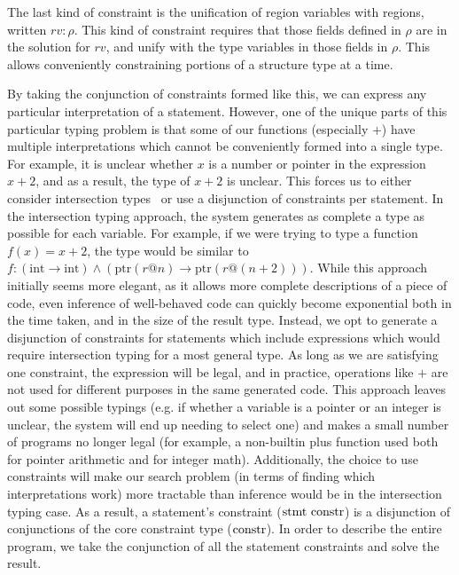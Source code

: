 The last kind of constraint is the unification of region variables with regions, written $rv : \rho$. This kind of constraint requires that those fields defined in $\rho$ are in the solution for $rv$, and unify with the type variables in those fields in $\rho$. This allows conveniently constraining portions of a structure type at a time.

By taking the conjunction of constraints formed like this, we can express any particular interpretation of a statement.
However, one of the unique parts of this particular typing problem is that some of our functions (especially +) have multiple interpretations which cannot be conveniently formed into a single type. For example, it is unclear whether $x$ is a number or pointer in the expression $x + 2$, and as a result, the type of $x + 2$ is unclear.
This forces us to either consider intersection types~\cite{Jim1995,Shao1993} or use a disjunction of constraints per statement. In the intersection typing approach, the system generates as complete a type as possible for each variable. For example, if we were trying to type a function $f(x) = x + 2$, the type would be similar to $f : (\mathrm{int} \rightarrow \mathrm{int}) \wedge (\mathrm{ptr}(r@n) \rightarrow \mathrm{ptr}(r@(n+2)))$. While this approach initially seems more elegant, as it allows more complete descriptions of a piece of code, even inference of well-behaved code can quickly become exponential both in the time taken, and in the size of the result type. Instead, we opt to generate a disjunction of constraints for statements which include expressions which would require intersection typing for a most general type. As long as we are satisfying one constraint, the expression will be legal, and in practice, operations like $+$ are not used for different purposes in the same generated code. This approach leaves out some possible typings (e.g. if whether a variable is a pointer or an integer is unclear, the system will end up needing to select one) and makes a small number of programs no longer legal (for example, a non-builtin plus function used both for pointer arithmetic and for integer math). Additionally, the choice to use constraints will make our search problem (in terms of finding which interpretations work) more tractable than inference would be in the intersection typing case. As a result, a statement's constraint ($\textrm{stmt constr}$) is a disjunction of conjunctions of the core constraint type ($\textrm{constr}$). In order to describe the entire program, we take the conjunction of all the statement constraints and solve the result.

